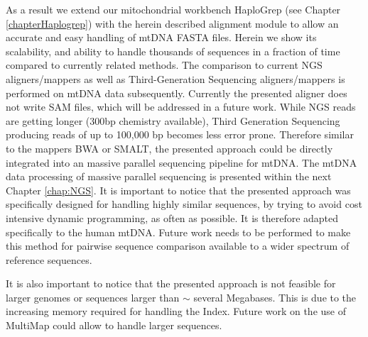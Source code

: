 As a result we extend our mitochondrial workbench HaploGrep (see Chapter \ref{chapterHaplogrep}) with the herein described alignment module to allow an accurate and easy handling of mtDNA FASTA files. Herein we show its scalability, and ability to handle thousands of sequences in a fraction of time compared to currently related methods. The comparison to current NGS aligners/mappers as well as Third-Generation Sequencing aligners/mappers is performed on mtDNA data subsequently. Currently the presented aligner does not write SAM files, which will be addressed in a future work. While NGS reads are getting longer (300bp chemistry available), Third Generation Sequencing producing reads of up to 100,000 bp becomes less error prone. Therefore similar to the mappers BWA or SMALT, the presented approach could be directly integrated into an massive parallel sequencing pipeline for mtDNA. 
The mtDNA data processing of massive parallel sequencing is presented within the next Chapter \ref{chap:NGS}. It is important to notice that the presented approach was specifically designed for handling highly similar sequences, by trying to avoid cost intensive dynamic programming, as often as possible. It is therefore adapted specifically to the human mtDNA. Future work needs to be performed to make this method for pairwise sequence comparison available to a wider spectrum of reference sequences. 

It is also important to notice that the presented approach is not feasible for larger genomes or sequences larger than $\sim$ several Megabases. This is due to the increasing memory required for handling the Index. Future work on the use of MultiMap could allow to handle larger sequences. 




